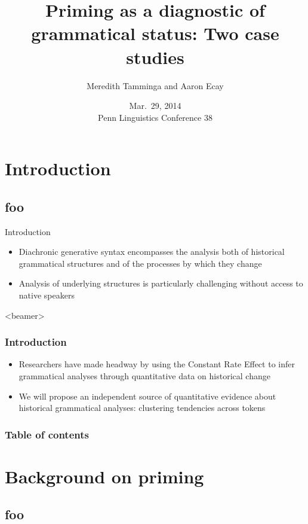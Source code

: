 \documentclass{digs-slides}
\title{Priming as a diagnostic of grammatical status: Two case studies}
\author{Meredith Tamminga and Aaron Ecay}
\institute{University of Pennsylvania}
\date{Mar.\ 29, 2014 \\\vspace{0.5em} Penn Linguistics Conference 38}
\begin{document}
\begin{frame}
    \titlepage
\end{frame}

\section{Introduction}

\subsection*{foo}

\begin{frame}{Introduction}
    \begin{itemize}
      \item Diachronic generative syntax encompasses the analysis both
        of historical grammatical structures and of the processes by
        which they change
      \item Analysis of underlying structures is particularly challenging
        without access to native speakers
    \end{itemize}
\end{frame}

\begin{frame}<beamer>
    \frametitle{Introduction}
    \begin{itemize}
      \item Researchers have made headway by using the Constant Rate
        Effect \parencite{Kroch1989} to infer grammatical
        analyses through quantitative data on historical change
      \item We will propose an independent source of quantitative
        evidence about historical grammatical analyses: clustering
        tendencies across tokens
    \end{itemize}
\end{frame}

\begin{frame}
    \frametitle{Table of contents}
    \tableofcontents{}
\end{frame}

\section{Background on priming}

\subsection*{foo}
\end{document}
